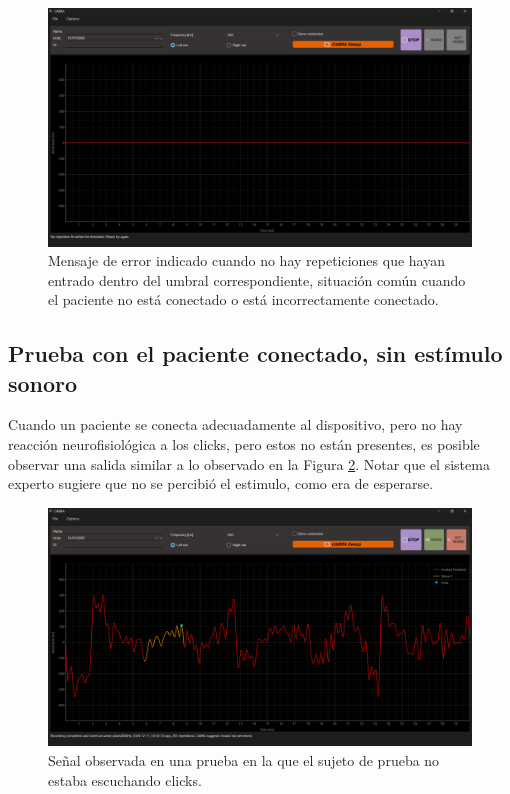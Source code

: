 \begin{figure}[H]
    \centering
    \includegraphics[width=1\linewidth]{figuras/UI-No-Patient.png}
    \caption{Mensaje de error indicado cuando no hay repeticiones que hayan entrado dentro del umbral correspondiente, situación común cuando el paciente no está conectado o está incorrectamente conectado.}
    \label{fig:UI-No-Patien}
\end{figure}

\subsection{Prueba con el paciente conectado, sin estímulo sonoro}

Cuando un paciente se conecta adecuadamente al dispositivo, pero no hay reacción neurofisiológica a los clicks, pero estos no están presentes, es posible observar una salida similar a lo observado en la Figura \ref{fig:UI-noise}. Notar que el sistema experto sugiere que no se percibió el estimulo, como era de esperarse.

\begin{figure}[H]
    \centering
    \includegraphics[width=1\linewidth]{figuras/UI-noise.png}
    \caption{Señal observada en una prueba en la que el sujeto de prueba no estaba escuchando clicks.}
    \label{fig:UI-noise}
\end{figure}

